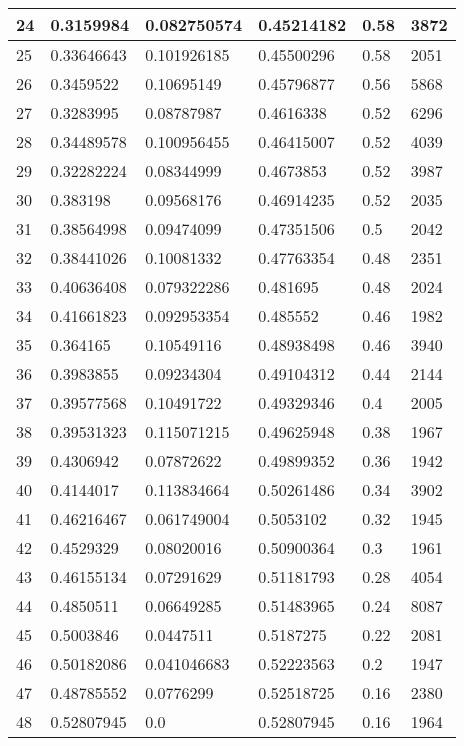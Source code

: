 \begin{longtable}{|l|l|l|l|l|l|}
24 & 0.3159984 & 0.082750574 & 0.45214182 & 0.58 & 3872 \\ \hline 
25 & 0.33646643 & 0.101926185 & 0.45500296 & 0.58 & 2051 \\ \hline 
26 & 0.3459522 & 0.10695149 & 0.45796877 & 0.56 & 5868 \\ \hline 
27 & 0.3283995 & 0.08787987 & 0.4616338 & 0.52 & 6296 \\ \hline 
28 & 0.34489578 & 0.100956455 & 0.46415007 & 0.52 & 4039 \\ \hline 
29 & 0.32282224 & 0.08344999 & 0.4673853 & 0.52 & 3987 \\ \hline 
30 & 0.383198 & 0.09568176 & 0.46914235 & 0.52 & 2035 \\ \hline 
31 & 0.38564998 & 0.09474099 & 0.47351506 & 0.5 & 2042 \\ \hline 
32 & 0.38441026 & 0.10081332 & 0.47763354 & 0.48 & 2351 \\ \hline 
33 & 0.40636408 & 0.079322286 & 0.481695 & 0.48 & 2024 \\ \hline 
34 & 0.41661823 & 0.092953354 & 0.485552 & 0.46 & 1982 \\ \hline 
35 & 0.364165 & 0.10549116 & 0.48938498 & 0.46 & 3940 \\ \hline 
36 & 0.3983855 & 0.09234304 & 0.49104312 & 0.44 & 2144 \\ \hline 
37 & 0.39577568 & 0.10491722 & 0.49329346 & 0.4 & 2005 \\ \hline 
38 & 0.39531323 & 0.115071215 & 0.49625948 & 0.38 & 1967 \\ \hline 
39 & 0.4306942 & 0.07872622 & 0.49899352 & 0.36 & 1942 \\ \hline 
40 & 0.4144017 & 0.113834664 & 0.50261486 & 0.34 & 3902 \\ \hline 
41 & 0.46216467 & 0.061749004 & 0.5053102 & 0.32 & 1945 \\ \hline 
42 & 0.4529329 & 0.08020016 & 0.50900364 & 0.3 & 1961 \\ \hline 
43 & 0.46155134 & 0.07291629 & 0.51181793 & 0.28 & 4054 \\ \hline 
44 & 0.4850511 & 0.06649285 & 0.51483965 & 0.24 & 8087 \\ \hline 
45 & 0.5003846 & 0.0447511 & 0.5187275 & 0.22 & 2081 \\ \hline 
46 & 0.50182086 & 0.041046683 & 0.52223563 & 0.2 & 1947 \\ \hline 
47 & 0.48785552 & 0.0776299 & 0.52518725 & 0.16 & 2380 \\ \hline 
48 & 0.52807945 & 0.0 & 0.52807945 & 0.16 & 1964 \\ \hline 

\end{longtable}
